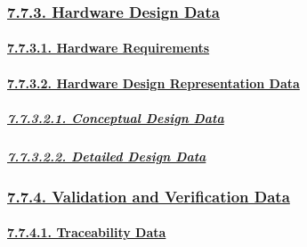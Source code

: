 \documentclass[
]{article}
\begin{document}
\hypertarget{hardware-design-data}{%
\subsubsection{\texorpdfstring{\protect\hyperlink{hardware-design-data-1}{7.7.3.
Hardware Design
Data}}{7.7.3. Hardware Design Data}}\label{hardware-design-data}}

\hypertarget{hardware-requirements}{%
\paragraph{\texorpdfstring{\protect\hyperlink{hardware-requirements-1}{7.7.3.1.
Hardware
Requirements}}{7.7.3.1. Hardware Requirements}}\label{hardware-requirements}}

\hypertarget{hardware-design-representation-data}{%
\paragraph{\texorpdfstring{\protect\hyperlink{hardware-design-representation-data-1}{7.7.3.2.
Hardware Design Representation
Data}}{7.7.3.2. Hardware Design Representation Data}}\label{hardware-design-representation-data}}

\hypertarget{conceptual-design-data}{%
\subparagraph{\texorpdfstring{\protect\hyperlink{conceptual-design-data-1}{7.7.3.2.1.
Conceptual Design
Data}}{7.7.3.2.1. Conceptual Design Data}}\label{conceptual-design-data}}

\hypertarget{detailed-design-data}{%
\subparagraph{\texorpdfstring{\protect\hyperlink{detailed-design-data-1}{7.7.3.2.2.
Detailed Design
Data}}{7.7.3.2.2. Detailed Design Data}}\label{detailed-design-data}}

\hypertarget{validation-and-verification-data}{%
\subsubsection{\texorpdfstring{\protect\hyperlink{validation-and-verification-data-1}{7.7.4.
Validation and Verification
Data}}{7.7.4. Validation and Verification Data}}\label{validation-and-verification-data}}

\hypertarget{traceability-data}{%
\paragraph{\texorpdfstring{\protect\hyperlink{traceability-data-1}{7.7.4.1.
Traceability
Data}}{7.7.4.1. Traceability Data}}\label{traceability-data}}
\end{document}
